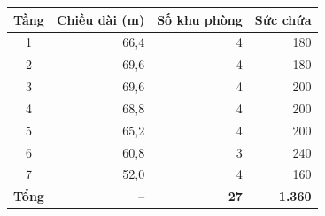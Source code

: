 \small\begin{tabular}{crrr}
\toprule
Tầng & Chiều dài (m) & Số khu phòng & Sức chứa\\\midrule
1 & 66,4 & 4 & 180\\
2 & 69,6 & 4 & 180\\
3 & 69,6 & 4 & 200\\
4 & 68,8 & 4 & 200\\
5 & 65,2 & 4 & 200\\
6 & 60,8 & 3 & 240\\
7 & 52,0 & 4 & 160\\
\textbf{Tổng} & -- & \textbf{27} & \textbf{1.360}\\
\bottomrule\end{tabular}
